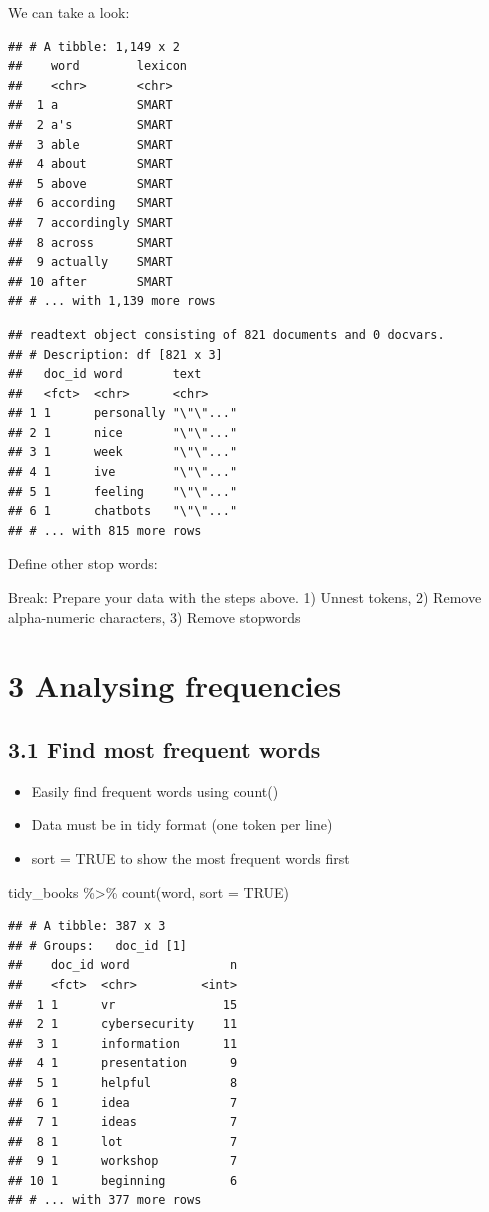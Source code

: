 \documentclass[a4paper, nobind]{templates/ociamthesis}
\providecommand{\tightlist}{%
  \setlength{\itemsep}{0pt}\setlength{\parskip}{0pt}}
\begin{document}
We can take a look:

\begin{verbatim}
## # A tibble: 1,149 x 2
##    word        lexicon
##    <chr>       <chr>  
##  1 a           SMART  
##  2 a's         SMART  
##  3 able        SMART  
##  4 about       SMART  
##  5 above       SMART  
##  6 according   SMART  
##  7 accordingly SMART  
##  8 across      SMART  
##  9 actually    SMART  
## 10 after       SMART  
## # ... with 1,139 more rows
\end{verbatim}

\begin{verbatim}
## readtext object consisting of 821 documents and 0 docvars.
## # Description: df [821 x 3]
##   doc_id word       text     
##   <fct>  <chr>      <chr>    
## 1 1      personally "\"\"..."
## 2 1      nice       "\"\"..."
## 3 1      week       "\"\"..."
## 4 1      ive        "\"\"..."
## 5 1      feeling    "\"\"..."
## 6 1      chatbots   "\"\"..."
## # ... with 815 more rows
\end{verbatim}

Define other stop words:

Break: Prepare your data with the steps above. 1) Unnest tokens, 2) Remove alpha-numeric characters, 3) Remove stopwords

\hypertarget{analysing-frequencies}{%
\section{3 Analysing frequencies}\label{analysing-frequencies}}

\hypertarget{find-most-frequent-words}{%
\subsection{3.1 Find most frequent words}\label{find-most-frequent-words}}

\begin{itemize}
\tightlist
\item
  Easily find frequent words using count()
\item
  Data must be in tidy format (one token per line)
\item
  sort = TRUE to show the most frequent words first
\end{itemize}

tidy\_books \%\textgreater\%
count(word, sort = TRUE)

\begin{verbatim}
## # A tibble: 387 x 3
## # Groups:   doc_id [1]
##    doc_id word              n
##    <fct>  <chr>         <int>
##  1 1      vr               15
##  2 1      cybersecurity    11
##  3 1      information      11
##  4 1      presentation      9
##  5 1      helpful           8
##  6 1      idea              7
##  7 1      ideas             7
##  8 1      lot               7
##  9 1      workshop          7
## 10 1      beginning         6
## # ... with 377 more rows
\end{verbatim}
\end{document}
